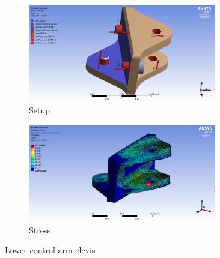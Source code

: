 \documentclass[10pt]{article}
\begin{document}
\begin{figure}[H]
\centering
\begin{subfigure}[b]{.48\textwidth}
\centering
\includegraphics[width=0.9\textwidth]{figures/fea/parts/MS00102-LowerControlArmClevis-Setup}
\caption{Setup}
\end{subfigure}
\begin{subfigure}[b]{.48\textwidth}
\centering
\includegraphics[width=0.9\textwidth]{figures/fea/parts/MS00102-LowerControlArmClevis-Stress}
\caption{Stress}
\end{subfigure}
\caption{Lower control arm clevis}
\label{fig:MS00102-LowerControlArmClevis}
\end{figure}
\end{document}
